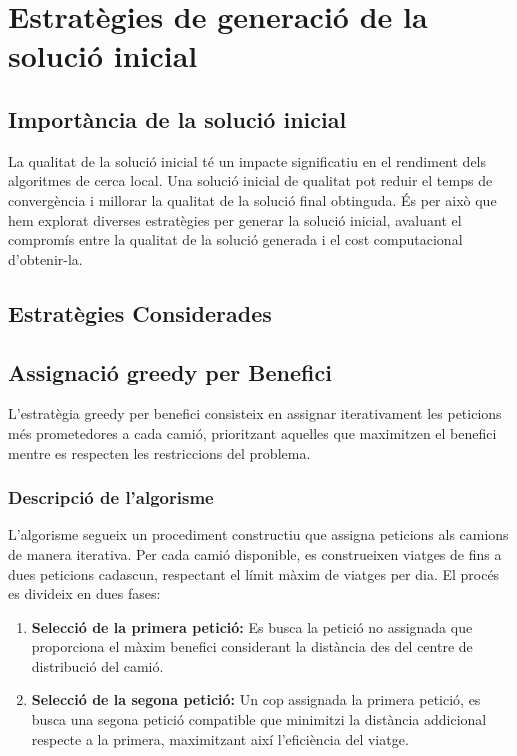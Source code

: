 \section{Estratègies de generació de la solució inicial}
\label{sec:initial}

\subsection{Importància de la solució inicial}

La qualitat de la solució inicial té un impacte significatiu en el rendiment dels algoritmes de cerca local. Una solució inicial de qualitat pot reduir el temps de convergència i millorar la qualitat de la solució final obtinguda. És per això que hem explorat diverses estratègies per generar la solució inicial, avaluant el compromís entre la qualitat de la solució generada i el cost computacional d'obtenir-la.

\subsection{Estratègies Considerades}

\subsection{Assignació greedy per Benefici}

L'estratègia greedy per benefici consisteix en assignar iterativament les peticions més prometedores a cada camió, prioritzant aquelles que maximitzen el benefici mentre es respecten les restriccions del problema.

\subsubsection{Descripció de l'algorisme}

L'algorisme segueix un procediment constructiu que assigna peticions als camions de manera iterativa. Per cada camió disponible, es construeixen viatges de fins a dues peticions cadascun, respectant el límit màxim de viatges per dia. El procés es divideix en dues fases:

\begin{enumerate}
    \item \textbf{Selecció de la primera petició:} Es busca la petició no assignada que proporciona el màxim benefici considerant la distància des del centre de distribució del camió.
    
    \item \textbf{Selecció de la segona petició:} Un cop assignada la primera petició, es busca una segona petició compatible que minimitzi la distància addicional respecte a la primera, maximitzant així l'eficiència del viatge.
\end{enumerate}

